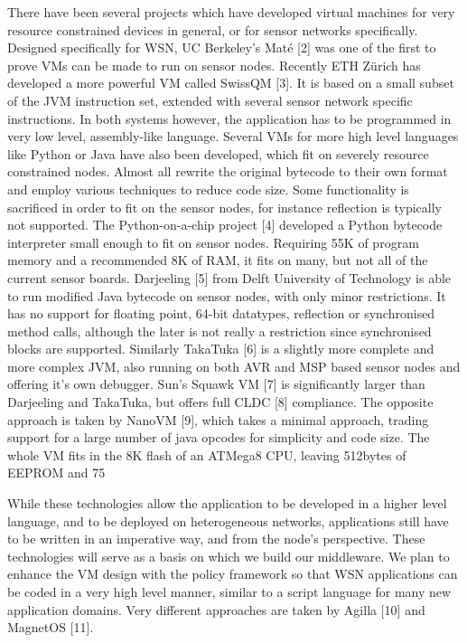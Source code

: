 There have been several projects which have developed virtual machines for very resource constrained devices in general, or for sensor networks specifically. Designed specifically for WSN, UC Berkeley’s Maté [2] was one of the first to prove VMs can be made to run on sensor nodes. Recently ETH Zürich has developed a more powerful VM called SwissQM [3]. It is based on a small subset of the JVM instruction set, extended with several sensor network specific instructions. In both systems however, the application has to be programmed in very low level, assembly-like language.
Several VMs for more high level languages like Python or Java have also been developed, which fit on severely resource constrained nodes. Almost all rewrite the original bytecode to their own format and employ various techniques to reduce code size. Some functionality is sacrificed in order to fit on the sensor nodes, for instance reflection is typically not supported.
The Python-on-a-chip project [4] developed a Python bytecode interpreter small enough to fit on sensor nodes. Requiring 55K of program memory and a recommended 8K of RAM, it fits on many, but not all of the current sensor boards. Darjeeling [5] from Delft University of Technology is able to run modified Java bytecode on sensor nodes, with only minor restrictions. It has no support for floating point, 64-bit datatypes, reflection or synchronised method calls, although the later is not really a restriction since synchronised blocks are supported. Similarly TakaTuka [6] is a slightly more complete and more complex JVM, also running on both AVR and MSP based sensor nodes and offering it’s own debugger. Sun’s Squawk VM [7] is significantly larger than Darjeeling and TakaTuka, but offers full CLDC [8] compliance.
The opposite approach is taken by NanoVM [9], which takes a minimal approach, trading support for a large number of java opcodes for simplicity and code size. The whole VM fits in the 8K flash of an ATMega8 CPU, leaving 512bytes of EEPROM and 75%

While these technologies allow the application to be developed in a higher level language, and to be deployed on heterogeneous networks, applications still have to be written in an imperative way, and from the node’s perspective. These technologies will serve as a basis on which we build our middleware. We plan to enhance the VM design with the policy framework so that WSN applications can be coded in a very high level manner, similar to a script language for many new application domains.
Very different approaches are taken by Agilla [10] and MagnetOS [11]. 

